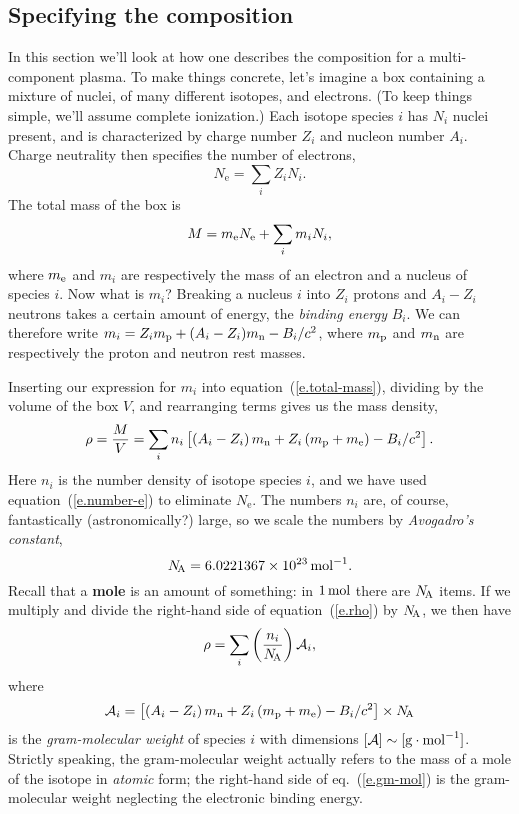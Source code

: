 \subsection{Specifying the composition}
In this section we'll look at how one describes the composition for a multi-component plasma.  To make things concrete, let's imagine a box containing a mixture of nuclei, of many different isotopes, and electrons.  (To keep things simple, we'll assume complete ionization.)  Each isotope species $i$ has $N_{i}$ nuclei present, and is characterized by charge number $Z_{i}$ and nucleon number $A_{i}$.  Charge neutrality then specifies the number of electrons,
\begin{equation}\label{e.number-e}
N_{\mathrm{e}} = \sum_{i} Z_{i} N_{i}.
\end{equation}
The total mass of the box is
\begin{equation}\label{e.total-mass}
M = m_\mathrm{e} N_{\mathrm{e}} + \sum_{i} m_{i}N_{i},
\end{equation}
where $m_\mathrm{e}$ and $m_{i}$ are respectively the mass of an electron and a nucleus of species $i$.  Now what is $m_{i}$? Breaking a nucleus $i$ into $Z_{i}$ protons and $A_{i}-Z_{i}$ neutrons takes a certain amount of energy, the \emph{binding energy} $B_{i}$.  We can therefore write $m_{i} = Z_{i}m_\mathrm{p} + (A_{i}-Z_{i})m_\mathrm{n} - B_{i}/c^{2}$, where $m_\mathrm{p}$ and $m_\mathrm{n}$ are respectively the proton and neutron rest masses.

Inserting our expression for $m_{i}$ into equation~(\ref{e.total-mass}), dividing by the volume of the box $V$, and rearranging terms gives us the mass density,
\begin{equation}\label{e.rho}
\rho = \frac{M}{V} = \sum_{i} n_{i}\left[ \left(A_{i}-Z_{i}\right) m_\mathrm{n} + Z_{i}\left(m_\mathrm{p} + m_\mathrm{e}\right) - B_{i}/c^{2}\right].
\end{equation}
Here $n_{i}$ is the number density of isotope species $i$, and we have used equation~(\ref{e.number-e}) to eliminate $N_{\mathrm{e}}$.  The numbers $n_{i}$ are, of course, fantastically (astronomically?) large, so we scale the numbers by \emph{Avogadro's constant},
\begin{equation}\label{e.avogadro-def}
N_\mathrm{\!A} = 6.0221367\times 10^{23}\,\mathrm{mol}^{-1}.
\end{equation}
Recall that a \textbf{mole} is an amount of something: in $1\,\mathrm{mol}$ there are $N_\mathrm{\!A}$ items. If we multiply and divide the right-hand side of equation~(\ref{e.rho}) by $N_\mathrm{\!A}$, we then have
\begin{equation}\label{e.molar-1}
\rho = \sum_{i} \left(\frac{n_{i}}{N_\mathrm{\!A}}\right) \mathcal{A}_{i},
\end{equation}
where
\begin{equation}\label{e.gm-mol}
\mathcal{A}_{i} = \left[ \left(A_{i}-Z_{i}\right) m_\mathrm{n} + Z_{i}\left(m_\mathrm{p} + m_\mathrm{e}\right) - B_{i}/c^{2}\right]\times N_\mathrm{\!A}
\end{equation}
is the \emph{gram-molecular weight} of species $i$ with dimensions $[\mathcal{A}]\sim[\mathrm{g}\cdot\mathrm{mol}^{-1}]$. Strictly speaking, the gram-molecular weight actually refers to the mass of a mole of the isotope in \emph{atomic} form; the right-hand side of eq.~(\ref{e.gm-mol}) is the gram-molecular weight neglecting the electronic binding energy.

